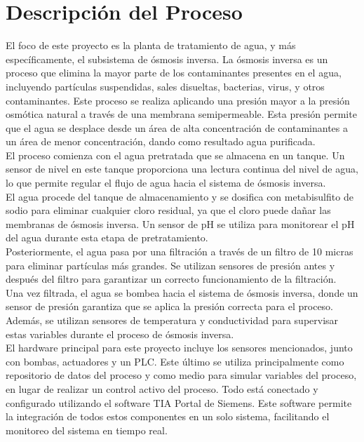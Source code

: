 \chapter{Descripción del Proceso}



El foco de este proyecto es la planta de tratamiento de agua, y más específicamente, el subsistema de ósmosis inversa. La ósmosis inversa es un proceso que elimina la mayor parte de los contaminantes presentes en el agua, incluyendo partículas suspendidas, sales disueltas, bacterias, virus, y otros contaminantes. Este proceso se realiza aplicando una presión mayor a la presión osmótica natural a través de una membrana semipermeable. Esta presión permite que el agua se desplace desde un área de alta concentración de contaminantes a un área de menor concentración, dando como resultado agua purificada.\\

El proceso comienza con el agua pretratada que se almacena en un tanque. Un sensor de nivel en este tanque proporciona una lectura continua del nivel de agua, lo que permite regular el flujo de agua hacia el sistema de ósmosis inversa.\\

El agua procede del tanque de almacenamiento y se dosifica con metabisulfito de sodio para eliminar cualquier cloro residual, ya que el cloro puede dañar las membranas de ósmosis inversa. Un sensor de pH se utiliza para monitorear el pH del agua durante esta etapa de pretratamiento.\\

Posteriormente, el agua pasa por una filtración a través de un filtro de 10 micras para eliminar partículas más grandes. Se utilizan sensores de presión antes y después del filtro para garantizar un correcto funcionamiento de la filtración.\\

Una vez filtrada, el agua se bombea hacia el sistema de ósmosis inversa, donde un sensor de presión garantiza que se aplica la presión correcta para el proceso. Además, se utilizan sensores de temperatura y conductividad para supervisar estas variables durante el proceso de ósmosis inversa.\\

El hardware principal para este proyecto incluye los sensores mencionados, junto con bombas, actuadores y un PLC. Este último se utiliza principalmente como repositorio de datos del proceso y como medio para simular variables del proceso, en lugar de realizar un control activo del proceso. Todo está conectado y configurado utilizando el software TIA Portal de Siemens. Este software permite la integración de todos estos componentes en un solo sistema, facilitando el monitoreo del sistema en tiempo real.\\

